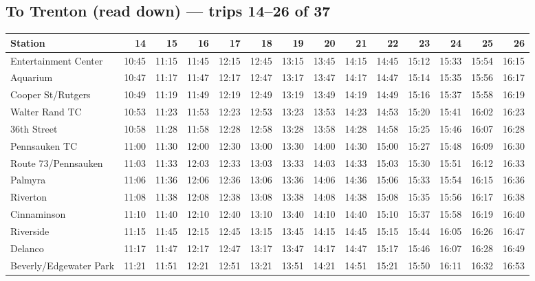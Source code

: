 \subsection*{To Trenton (read down) --- trips 14--26 of 37}
\begin{center}\footnotesize\setlength{\tabcolsep}{3pt}\begin{tabular}{@{}lrrrrrrrrrrrrr@{}}\toprule
Station & 14 & 15 & 16 & 17 & 18 & 19 & 20 & 21 & 22 & 23 & 24 & 25 & 26 \\\midrule
Entertainment Center & 10:45 & 11:15 & 11:45 & 12:15 & 12:45 & 13:15 & 13:45 & 14:15 & 14:45 & 15:12 & 15:33 & 15:54 & 16:15 \\
Aquarium & 10:47 & 11:17 & 11:47 & 12:17 & 12:47 & 13:17 & 13:47 & 14:17 & 14:47 & 15:14 & 15:35 & 15:56 & 16:17 \\
Cooper St/Rutgers & 10:49 & 11:19 & 11:49 & 12:19 & 12:49 & 13:19 & 13:49 & 14:19 & 14:49 & 15:16 & 15:37 & 15:58 & 16:19 \\
Walter Rand TC & 10:53 & 11:23 & 11:53 & 12:23 & 12:53 & 13:23 & 13:53 & 14:23 & 14:53 & 15:20 & 15:41 & 16:02 & 16:23 \\
36th Street & 10:58 & 11:28 & 11:58 & 12:28 & 12:58 & 13:28 & 13:58 & 14:28 & 14:58 & 15:25 & 15:46 & 16:07 & 16:28 \\
Pennsauken TC & 11:00 & 11:30 & 12:00 & 12:30 & 13:00 & 13:30 & 14:00 & 14:30 & 15:00 & 15:27 & 15:48 & 16:09 & 16:30 \\
Route 73/Pennsauken & 11:03 & 11:33 & 12:03 & 12:33 & 13:03 & 13:33 & 14:03 & 14:33 & 15:03 & 15:30 & 15:51 & 16:12 & 16:33 \\
Palmyra & 11:06 & 11:36 & 12:06 & 12:36 & 13:06 & 13:36 & 14:06 & 14:36 & 15:06 & 15:33 & 15:54 & 16:15 & 16:36 \\
Riverton & 11:08 & 11:38 & 12:08 & 12:38 & 13:08 & 13:38 & 14:08 & 14:38 & 15:08 & 15:35 & 15:56 & 16:17 & 16:38 \\
Cinnaminson & 11:10 & 11:40 & 12:10 & 12:40 & 13:10 & 13:40 & 14:10 & 14:40 & 15:10 & 15:37 & 15:58 & 16:19 & 16:40 \\
Riverside & 11:15 & 11:45 & 12:15 & 12:45 & 13:15 & 13:45 & 14:15 & 14:45 & 15:15 & 15:44 & 16:05 & 16:26 & 16:47 \\
Delanco & 11:17 & 11:47 & 12:17 & 12:47 & 13:17 & 13:47 & 14:17 & 14:47 & 15:17 & 15:46 & 16:07 & 16:28 & 16:49 \\
Beverly/Edgewater Park & 11:21 & 11:51 & 12:21 & 12:51 & 13:21 & 13:51 & 14:21 & 14:51 & 15:21 & 15:50 & 16:11 & 16:32 & 16:53 \\

\end{tabular}
\end{center}
